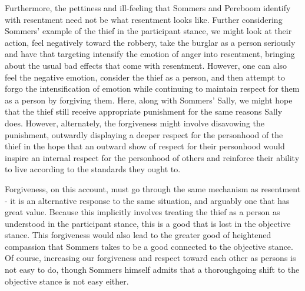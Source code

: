 \documentclass[phd,12pt,oneside,paper=letterpaper]{ubcthesis}
\begin{document}
Furthermore, the pettiness and ill-feeling that Sommers and Pereboom identify with resentment need not be what resentment looks like. Further considering Sommers' example of the thief in the participant stance, we might look at their action, feel negatively toward the robbery, take the burglar as a person seriously and have that targeting intensify the emotion of anger into resentment, bringing about the usual bad effects that come with resentment. However, one can also feel the negative emotion, consider the thief as a person, and then attempt to forgo the intensification of emotion while continuing to maintain respect for them as a person by forgiving them. Here, along with Sommers' Sally, we might hope that the thief still receive appropriate punishment for the same reasons Sally does. However, alternately, the forgiveness might involve disavowing the punishment, outwardly displaying a deeper respect for the personhood of the thief in the hope that an outward show of respect for their personhood would inspire an internal respect for the personhood of others and reinforce their ability to live according to the standards they ought to. 

Forgiveness, on this account, must go through the same mechanism as resentment - it is an alternative response to the same situation, and arguably one that has great value. Because this implicitly involves treating the thief as a person as understood in the participant stance, this is a good that is lost in the objective stance. This forgiveness would also lead to the greater good of heightened compassion that Sommers takes to be a good connected to the objective stance. Of course, increasing our forgiveness and respect toward each other as persons is not easy to do, though Sommers himself admits that a thoroughgoing shift to the objective stance is not easy either. 
\end{document}
